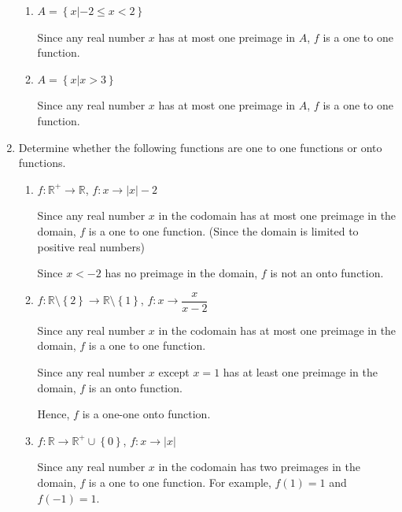 \documentclass[12pt]{report}
\begin{document}
\begin{enumerate}
\begin{enumerate}
                  \item $A = \left\{x | -2 \leq x < 2\right\}$
                        \sol{}

                        Since any real number $x$ has at most one preimage in $A$, $f$ is a one to one
                        function.

                  \item $A = \left\{x | x > 3\right\}$
                        \sol{}

                        Since any real number $x$ has at most one preimage in $A$, $f$ is a one to one
                        function.
            \end{enumerate}

            \newpage
      \item Determine whether the following functions are one to one functions or onto
            functions.
            \begin{enumerate}
                  \item $f: \mathbb{R}^+ \to \mathbb{R}$, $f:x \to |x|-2$
                        \sol{}

                        Since any real number $x$ in the codomain has at most one preimage in the
                        domain, $f$ is a one to one function. (Since the domain is limited to positive
                        real numbers)

                        Since $x < -2$ has no preimage in the domain, $f$ is not an onto function.

                  \item $f: \mathbb{R}\setminus\left\{2\right\} \to \mathbb{R}\setminus\left\{1\right\}$, $f:x \to \dfrac{x}{x-2}$
                        \sol{}

                        Since any real number $x$ in the codomain has at most one preimage in the
                        domain, $f$ is a one to one function.

                        Since any real number $x$ except $x = 1$ has at least one preimage in the
                        domain, $f$ is an onto function.

                        Hence, $f$ is a one-one onto function.

                  \item $f: \mathbb{R} \to \mathbb{R}^+\cup\left\{0\right\}$, $f:x \to |x|$
                        \sol{}

                        Since any real number $x$ in the codomain has two preimages in the domain, $f$
                        is a one to one function. For example, $f (1) = 1$ and $f (-1) = 1$.


\end{enumerate}
\end{enumerate}
\end{document}
